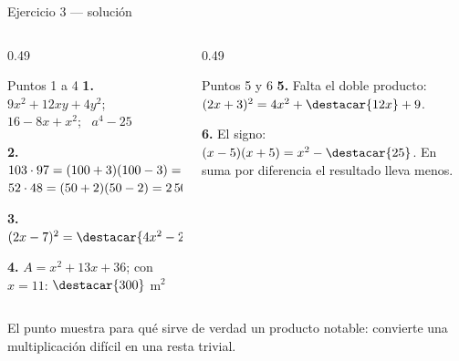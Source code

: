 \documentclass[aspectratio=169,10pt]{beamer}
\begin{document}
\begin{frame}{Ejercicio 3 — solución}
  \scriptsize
  \begin{columns}[T,onlytextwidth]
    \begin{column}{0.49\textwidth}
      \begin{block}{Puntos 1 a 4}
        \tiny
        \textbf{1.} $9x^2+12xy+4y^2$; \ $16-8x+x^2$; \ $a^4-25$

        \vspace{0.06cm}
        \textbf{2.} $103\cdot 97 = (100+3)(100-3) = 10\,000-9
        = \destacar{9\,991}$ \\
        $52\cdot 48 = (50+2)(50-2) = 2\,500-4 = \destacar{2\,496}$

        \vspace{0.06cm}
        \textbf{3.} $(2x-7)^{2} = \destacar{4x^{2}-28x+49}$

        \vspace{0.06cm}
        \textbf{4.} $A = x^2+13x+36$; con $x=11$: $\destacar{300}$ m$^2$
      \end{block}
    \end{column}
    \begin{column}{0.49\textwidth}
      \begin{alertblock}{Puntos 5 y 6}
        \tiny
        \textbf{5.} Falta el doble producto:
        $(2x+3)^{2} = 4x^{2}+\destacar{12x}+9$.

        \vspace{0.08cm}
        \textbf{6.} El signo:
        $(x-5)(x+5) = x^{2}-\destacar{25}$. En suma por diferencia el resultado
         lleva menos.
      \end{alertblock}
    \end{column}
  \end{columns}

  \vspace{0.05cm}
  {\tiny\color{uniGris} El punto  muestra para qué sirve de verdad
  un producto notable: convierte una multiplicación difícil en una resta
  trivial. }
\end{frame}
\end{document}
